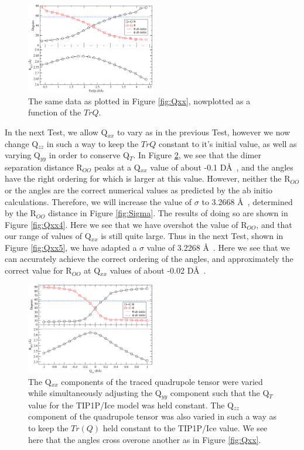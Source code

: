 \documentclass[aps, jcp, prl, reprint, groupedaddress, superscriptaddress, twocolumn]{revtex4-1}
\begin{document}
\begin{figure}[h!]
\includegraphics[width = 0.5\textwidth]{Test4_plot2.pdf}
\caption{\label{fig:Qxx2} The same data as plotted in Figure \ref{fig:Qxx}, nowplotted as a function of the $TrQ$.}
\end{figure}

In the next Test, we allow Q$_{xx}$ to vary as in the previous Test, however
we now change Q$_{zz}$ in such a way to keep the $TrQ$ constant to it's 
initial value, as well as varying Q$_{yy}$ in order to conserve Q$_T$. 
In Figure \ref{fig:Qxx3}, we see that the dimer separation 
distance R$_{OO}$ peaks at a Q$_{xx}$ value of about -0.1 D\AA~, and the angles
have the right ordering for which is larger at this value. However, neither 
the R$_{OO}$ or the angles are the correct numerical values as predicted by
the ab initio calculations. Therefore, we will increase the value of 
$\sigma$ to 3.2668 \AA~, determined by the R$_{OO}$ distance in Figure 
\ref{fig:Sigma}. The results of doing so are shown in Figure \ref{fig:Qxx4}. 
Here we see that we have overshot the value of R$_{OO}$, and that our range of
values of Q$_{xx}$ is still quite large. Thus in the next Test, shown in
Figure \ref{fig:Qxx5}, we have adapted a $\sigma$ value of 3.2268 \AA~. Here we
see that we can accurately achieve the correct ordering of the angles, and
approximately 
the correct value for R$_{OO}$ at Q$_{xx}$ values of about -0.02 D\AA~. 

\begin{figure}[h!]
\includegraphics[width = 0.5\textwidth]{Test5_plot.pdf}
\caption{\label{fig:Qxx3} The Q$_{xx}$ components of the traced quadrupole tensor were varied while simultaneously adjusting the Q$_{yy}$ component such that the  Q$_T$ value for the TIP1P/Ice model was held constant. The Q$_{zz}$ component of the quadrupole tensor was also varied in such a way as to keep the $Tr(Q)$ held constant to the TIP1P/Ice value. We see here that the angles cross overone another as in Figure \ref{fig:Qxx}.}
\end{figure}
\end{document}
